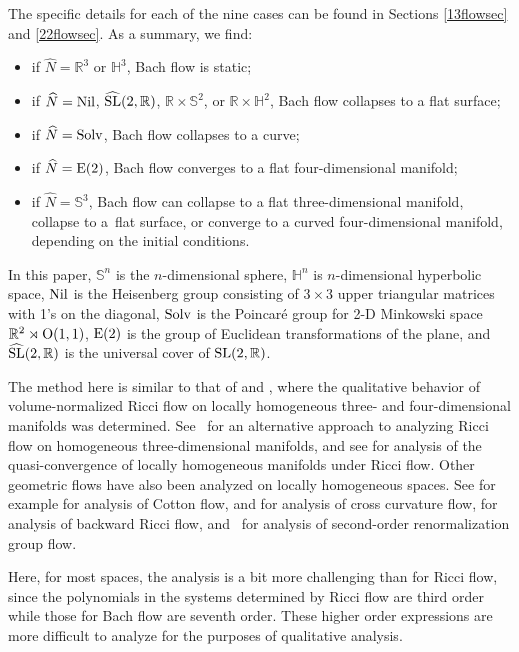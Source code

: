 \documentclass[10pt,a4paper]{amsart}
\numberwithin{equation}{section}
\begin{document}
The specific details for each of the nine cases can be found in Sections \ref{13flowsec} and \ref{22flowsec}. As a summary, we find:
\begin{itemize}\itemsep=0pt
\item if $\widehat{N} = \mathbb{R}^3$ or $\mathbb{H}^3$, Bach flow is static;
\item if $\widehat{N} = {\rm Nil}$, $\widehat{{\rm SL}}(2,\mathbb{R})$, $\mathbb{R} \times \mathbb{S}^2$, or $\mathbb{R} \times \mathbb{H}^2$, Bach flow collapses to a flat surface;
\item if $\widehat{N} = {\rm Solv}$, Bach flow collapses to a curve;
\item if $\widehat{N} = {\rm E}(2)$, Bach flow converges to a flat four-dimensional manifold;
\item if  $\widehat{N} = \mathbb{S}^3$, Bach flow can collapse to a flat three-dimensional manifold, collapse to a~flat surface, or converge to a curved four-dimensional manifold, depending on the initial conditions.
\end{itemize}
In this paper, $\mathbb{S}^n$ is the $n$-dimensional sphere, $\mathbb{H}^n$ is $n$-dimensional hyperbolic space, ${\rm Nil}$ is the Heisenberg group consisting of $3 \times 3$ upper triangular matrices with 1's on the diagonal, ${\rm Solv}$ is the Poincar\'{e} group for 2-D Minkowski space $\mathbb{R}^2 \rtimes {\rm O}(1,1)$, ${\rm E}(2)$ is the group of Euclidean transformations of the plane, and $\widehat{{\rm SL}}(2, \mathbb{R})$ is the universal cover of ${\rm SL}(2, \mathbb{R})$.

 The method here is similar to that of \cite{IJ} and \cite{IJL}, where the qualitative behavior of volume-normalized Ricci flow on locally homogeneous three- and four-dimensional manifolds was determined. See~\cite{GlickPayne} for an alternative approach to analyzing Ricci flow on homogeneous three-dimensional manifolds, and see \cite{KM} for analysis of the quasi-convergence of locally homogeneous manifolds under Ricci flow. Other geometric flows have also been analyzed on locally homogeneous spaces. See for example \cite{KST} for analysis of Cotton flow, \cite{CNSC} and \cite{CSC2} for analysis of cross curvature flow, \cite{CSC} for analysis of backward Ricci flow, and~\cite{GGI} for analysis of second-order renormalization group flow.

Here, for most spaces, the analysis is a bit more challenging than for Ricci flow, since the polynomials in the systems determined by Ricci flow are third order while those for Bach flow are seventh order. These higher order expressions are more difficult to analyze for the purposes of qualitative analysis.
\end{document}
